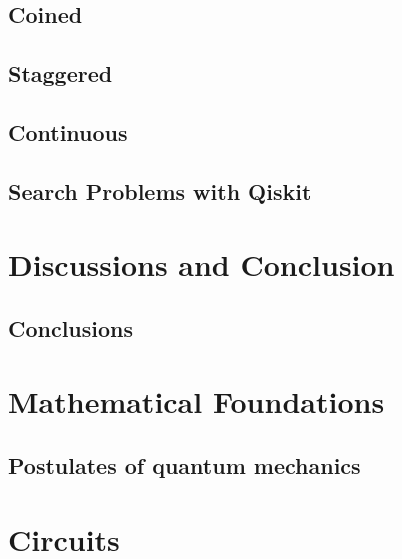 \documentclass[
oneside,
11pt, a4paper,
footinclude=true,
headinclude=true,
cleardoublepage=empty
]{scrbook}
\begin{document}
\section{Coined}\label{sec:CoinedQiskit}

\section{Staggered}\label{sec:StagQiskit}

\section{Continuous}\label{sec:ContQiskit}

\section{Search Problems with Qiskit}\label{sec:SearchProblemsQiskit}


\chapter{Discussions and Conclusion}
\section{Conclusions}








\chapter{Mathematical Foundations}
\section{Postulates of quantum mechanics}\label{sec:PostulatesQM}

\chapter{Circuits}
\end{document}

